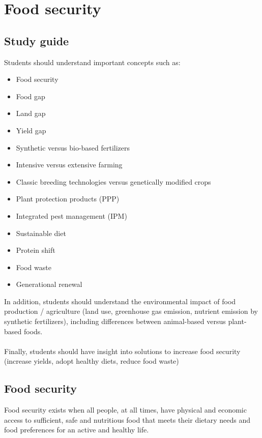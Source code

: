 \documentclass[../summary.tex]{subfiles}
\begin{document}
	
	\section{Food security}
	
	\subsection{Study guide}
	
	Students should understand important concepts such as:
	\begin{itemize} 
	\item Food security
	\item Food gap
	\item Land gap
	\item Yield gap
	\item Synthetic versus bio-based fertilizers
	\item Intensive versus extensive farming
	\item Classic breeding technologies versus genetically modified crops
	\item Plant protection products (PPP)
	\item Integrated pest management (IPM)
	\item Sustainable diet
	\item Protein shift
	\item Food waste
	\item Generational renewal
	\end{itemize}
	In addition, students should understand the environmental impact of food production / agriculture (land use, greenhouse gas emission, nutrient emission by synthetic fertilizers), including differences between animal-based versus plant-based foods.
	\\\\
	Finally, students should have insight into solutions to increase food security (increase yields, adopt healthy
	diets, reduce food waste)
	
	\subsection{Food security}
	
	Food security exists when all people, at all times, have physical and economic access to sufficient, safe and nutritious food that meets their dietary needs and food preferences for an active and healthy life. 
	
	
\end{document}
